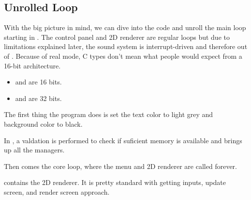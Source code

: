 \documentclass[book.tex]{subfiles}
\begin{document}
\subsection{Unrolled Loop}
With the big picture in mind, we can dive into the code and unroll the main loop starting in . The control panel and 2D renderer are regular loops but due to limitations explained later, the sound system is interrupt-driven and therefore out of . Because of real mode, C types don't mean what people would expect from a 16-bit architecture.
\begin{itemize}
\item {} and  are 16 bits.
\item {} and  are 32 bits.
\end{itemize}
\par
The first thing the program does is set the text color to light grey and background color to black.\\
\par
\begin{minipage}{\textwidth}

\end{minipage}
\par

\par
In , a valdation is performed to check if suficient memory is available and brings up all the managers.\\
\par
\begin{minipage}{\textwidth}

\end{minipage}
\par
Then comes the core loop, where the menu and 2D renderer are called forever.

\begin{minipage}{\textwidth}

\end{minipage}
\par
{} contains the 2D renderer. It is pretty standard with getting inputs, update screen, and render screen approach.\\
\par
\begin{minipage}{\textwidth}

\end{minipage} \\
\par
 
\end{document}
